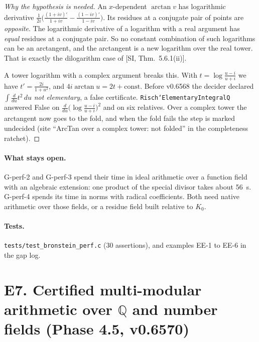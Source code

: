 \documentclass[11pt]{article}
\theoremstyle{definition}
\theoremstyle{remark}
\newcommand{\Q}{\mathbb{Q}}
\newcommand{\code}[1]{\texttt{#1}}
\begin{document}
\begin{proof}[Why the hypothesis is needed]
An $x$-dependent $\arctan v$ has logarithmic derivative
$\frac1{2i}\bigl(\frac{(1+iv)'}{1+iv}-\frac{(1-iv)'}{1-iv}\bigr)$. Its residues
at a conjugate pair of points are \emph{opposite}. The logarithmic derivative
of a logarithm with a real argument has \emph{equal} residues at a conjugate
pair. So no constant combination of such logarithms can be an arctangent, and
the arctangent is a new logarithm over the real tower. That is exactly the
dilogarithm case of [SI, Thm.~5.6.1(ii)].

A tower logarithm with a complex argument breaks this. With
$t=\log\frac{u-i}{u+i}$ we have $t'=\frac{2i}{1+u^2}$, and
$4i\arctan u=2t+\text{const}$. Before v0.6568 the decider declared
$\int\frac{d}{du}t^2\,du$ \emph{not elementary}, a false certificate.
\code{Risch`ElementaryIntegralQ} answered False on
$\frac{d}{du}\bigl(\log\frac{u-i}{u+i}\bigr)^2$ and on six relatives. Over a
complex tower the arctangent now goes to the fold, and when the fold fails the
step is marked undecided (site ``ArcTan over a complex tower: not folded'' in
the completeness ratchet).
\end{proof}

\paragraph{What stays open.} G-perf-2 and G-perf-3 spend their time in ideal
arithmetic over a function field with an algebraic extension: one product of
the special divisor takes about 56~s. G-perf-4 spends its time in norms with
radical coefficients. Both need native arithmetic over those fields, or a
residue field built relative to $K_0$.

\paragraph{Tests.} \code{tests/test\_bronstein\_perf.c} (30 assertions), and
examples EE-1 to EE-6 in the gap log.

\section*{E7. Certified multi-modular arithmetic over $\Q$ and number fields (Phase 4.5, v0.6570)}
\end{document}
